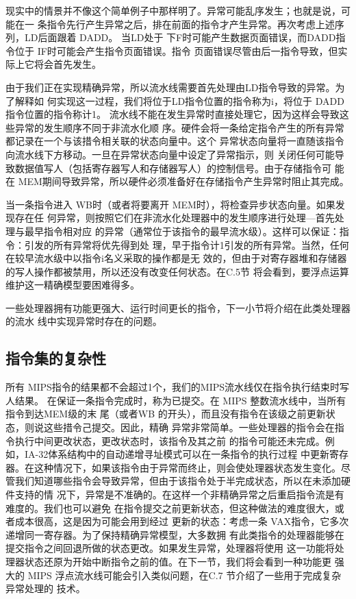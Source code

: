现实中的情景并不像这个简单例子中那样明了。异常可能乱序发生；也就是说，可能在一
条指令先行产生异常之后，排在前面的指令才产生异常。再次考虑上述序列，LD后面跟着 DADD。
当LD处于 下F时可能产生数据页面错误，而DADD指令位于 IF时可能会产生指令页面错误。指令
页面错误尽管由后一指令导致，但实际上它将会首先发生。

由于我们正在实现精确异常，所以流水线需要首先处理由LD指令导致的异常。为了解释如
何实现这一过程，我们将位于LD指令位置的指令称为i，将位于 DADD 指令位置的指令称计1。
流水线不能在发生异常时直接处理它，因为这样会导致这些异常的发生顺序不同于非流水化顺
序。硬件会将一条给定指令产生的所有异常都记录在一个与该措令相关联的状态向量中。这个
异常状态向量将一直随该指令向流水线下方移动。一旦在异常状态向量中设定了异常指示，则
关闭任何可能导致数据值写人（包括寄存器写人和存储器写人）的控制信号。由于存储指令可
能在 MEM期间导致异常，所以硬件必须准备好在存储指令产生异常时阻止其完成。

当一条指令进入 WB时（或者将要离开 MEM时），将检查异步状态向量。如果发现存在任
何异常，则按照它们在非流水化处理器中的发生顺序进行处理—首先处理与最早指令相对应
的异常（通常位于该指令的最早流水级）。这样可以保证：指令：引发的所有异常将优先得到处
理，早于指令计1引发的所有异常。当然，任何在较早流水级中以指令i名义采取的操作都是无
效的，但由于对寄存器堆和存储器的写人操作都被禁用，所以还没有改变任何状态。在C.5节
将会看到，要浮点运算维护这一精确模型要困难得多。

一些处理器拥有功能更强大、运行时间更长的指令，下一小节将介绍在此类处理器的流水
线中实现异常时存在的问题。

\subsection{指令集的复杂性}
所有 MIPS指令的结果都不会超过1个，我们的MIPS流水线仅在指令执行结束时写人结果。
在保证一条指令完成时，称为已提交。在 MIPS 整数流水线中，当所有指令到达MEM级的末
尾（或者WB 的开头），而且没有指令在该级之前更新状态，则说这些措令己提交。因此，精确
异常非常简单。一些处理器的指令会在指令执行中间更改状态，更改状态时，该指令及其之前
的指令可能还未完成。例如，IA-32体系结构中的自动递增寻址模式可以在一条指令的执行过程
中更新寄存器。在这种情况下，如果该指令由于异常而终止，则会使处理器状态发生变化。尽
管我们知道哪些指令会导致异常，但由于该指令处于半完成状态，所以在未添加硬件支持的情
况下，异常是不准确的。在这样一个非精确异常之后重启指令流是有难度的。我们也可以避免
在指令提交之前更新状态，但这种做法的难度很大，或者成本很高，这是因为可能会用到经过
更新的状态：考虑一条 VAX指令，它多次递增同一寄存器。为了保持精确异常模型，大多数拥
有此类指令的处理器能够在提交指令之间回退所做的状态更改。如果发生异常，处理器将使用
这一功能将处理器状态还原为开始中断指令之前的值。在下一节，我们将会看到一种功能更
强大的 MIPS 浮点流水线可能会引入类似问题，在C.7 节介绍了一些用于完成复杂异常处理的
技术。

